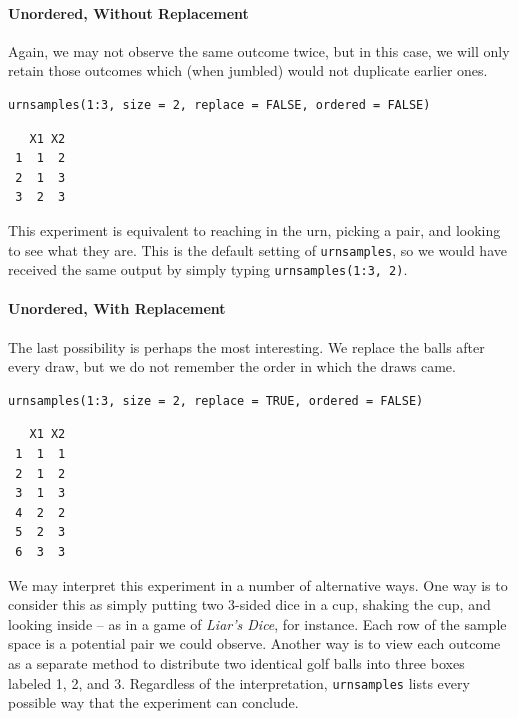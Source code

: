 \documentclass[captions=tableheading]{scrbook}
\begin{document}
\begin{example}
\paragraph*{Unordered, Without Replacement}

Again, we may not observe the same outcome twice, but in this case, we will only retain those outcomes which (when jumbled) would not duplicate earlier ones. 


\begin{verbatim}
urnsamples(1:3, size = 2, replace = FALSE, ordered = FALSE)
\end{verbatim}

\begin{verbatim}
   X1 X2
 1  1  2
 2  1  3
 3  2  3
\end{verbatim}

This experiment is equivalent to reaching in the urn, picking a pair, and looking to see what they are. This is the default setting of \texttt{urnsamples}, so we would have received the same output by simply typing \texttt{urnsamples(1:3, 2)}.

\paragraph*{Unordered, With Replacement}

The last possibility is perhaps the most interesting. We replace the balls after every draw, but we do not remember the order in which the draws came. 


\begin{verbatim}
urnsamples(1:3, size = 2, replace = TRUE, ordered = FALSE)
\end{verbatim}

\begin{verbatim}
   X1 X2
 1  1  1
 2  1  2
 3  1  3
 4  2  2
 5  2  3
 6  3  3
\end{verbatim}

We may interpret this experiment in a number of alternative ways. One way is to consider this as simply putting two 3-sided dice in a cup, shaking the cup, and looking inside -- as in a game of \emph{Liar's Dice}, for instance. Each row of the sample space is a potential pair we could observe. Another way is to view each outcome as a separate method to distribute two identical golf balls into three boxes labeled 1, 2, and 3. Regardless of the interpretation, \texttt{urnsamples} lists every possible way that the experiment can conclude.

\end{example}
\end{document}
